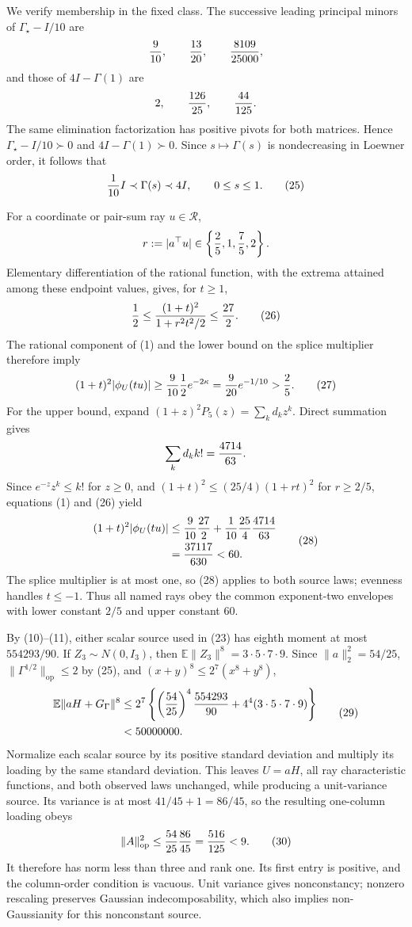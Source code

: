 We verify membership in the fixed class.  The successive leading principal minors of \(\Gamma_\star-I/10\) are
\[
 {9\over10},\qquad {13\over20},\qquad {8109\over25000},
\]
and those of \(4I-\Gamma(1)\) are
\[
 2,\qquad {126\over25},\qquad {44\over125}.
\]
The same elimination factorization has positive pivots for both matrices.  Hence \(\Gamma_\star-I/10\succ0\) and \(4I-\Gamma(1)\succ0\).  Since \(s\mapsto\Gamma(s)\) is nondecreasing in Loewner order, it follows that
\[
 {1\over10}I\prec\Gamma(s)\prec4I,
 \qquad0\le s\le1. \tag{25}
\]

For a coordinate or pair-sum ray \(u\in\mathcal R\),
\[
 r:=|a^\top u|\in\left\{{2\over5},1,{7\over5},2\right\}.
\]
Elementary differentiation of the rational function, with the extrema attained among these endpoint values, gives, for \(t\ge1\),
\[
 {1\over2}\le{(1+t)^2\over1+r^2t^2/2}\le{27\over2}. \tag{26}
\]
The rational component of (1) and the lower bound on the splice multiplier therefore imply
\[
 (1+t)^2|\phi_U(tu)|
 \ge{9\over10}{1\over2}e^{-2\kappa}
 ={9\over20}e^{-1/10}>{2\over5}. \tag{27}
\]
For the upper bound, expand \((1+z)^2P_5(z)=\sum_kd_kz^k\).  Direct summation gives
\[
 \sum_kd_kk!={4714\over63}.
\]
Since \(e^{-z}z^k\le k!\) for \(z\ge0\), and \((1+t)^2\le(25/4)(1+rt)^2\) for \(r\ge2/5\), equations (1) and (26) yield
\[
 \begin{aligned}
 (1+t)^2|\phi_U(tu)|
 &\le {9\over10}{27\over2}
 +{1\over10}{25\over4}{4714\over63}\\
 &={37117\over630}<60.
 \end{aligned} \tag{28}
\]
The splice multiplier is at most one, so (28) applies to both source laws; evenness handles \(t\le-1\).  Thus all named rays obey the common exponent-two envelopes with lower constant \(2/5\) and upper constant \(60\).

By (10)--(11), either scalar source used in (23) has eighth moment at most \(554293/90\).  If \(Z_3\sim N(0,I_3)\), then \(\mathbb E\|Z_3\|^8=3\cdot5\cdot7\cdot9\).  Since \(\|a\|_2^2=54/25\), \(\|\Gamma^{1/2}\|_{\mathrm{op}}\le2\) by (25), and \((x+y)^8\le2^7(x^8+y^8)\),
\[
 \begin{aligned}
 \mathbb E\|aH+G_\Gamma\|^8
 &\le2^7\left\{
 \left({54\over25}\right)^4{554293\over90}
 +4^4(3\cdot5\cdot7\cdot9)\right\}\\
 &<50000000. 
 \end{aligned} \tag{29}
\]
Normalize each scalar source by its positive standard deviation and multiply its loading by the same standard deviation.  This leaves \(U=aH\), all ray characteristic functions, and both observed laws unchanged, while producing a unit-variance source.  Its variance is at most \(41/45+1=86/45\), so the resulting one-column loading obeys
\[
 \|A\|_{\mathrm{op}}^2
 \le{54\over25}{86\over45}={516\over125}<9. \tag{30}
\]
It therefore has norm less than three and rank one.  Its first entry is positive, and the column-order condition is vacuous.  Unit variance gives nonconstancy; nonzero rescaling preserves Gaussian indecomposability, which also implies non-Gaussianity for this nonconstant source.

